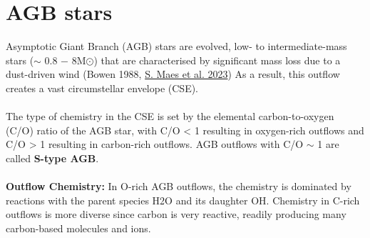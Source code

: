 \section{AGB stars}

Asymptotic Giant Branch (AGB) stars are evolved, low- to intermediate-mass stars ($\sim$ 0.8 − 8M$\odot$) that are characterised by significant mass loss due to a dust-driven wind (Bowen 1988, \href{https://arxiv.org/pdf/2304.05924.pdf}{S. Maes et al. 2023}) As a result, this outflow creates a vast circumstellar envelope (CSE).\\
\\
The type of chemistry in the CSE is set by the elemental carbon-to-oxygen (C/O) ratio of the AGB star, with C/O < 1 resulting in oxygen-rich outflows and C/O > 1 resulting in carbon-rich outflows. AGB outflows with C/O $\sim$ 1 are called \textbf{S-type AGB}. \\
\\
\textbf{Outflow Chemistry:} 
In O-rich AGB outflows, the chemistry is dominated by reactions with the parent species H2O and its daughter OH. Chemistry in C-rich outflows is more diverse since carbon is very reactive, readily producing many carbon-based molecules and ions. 